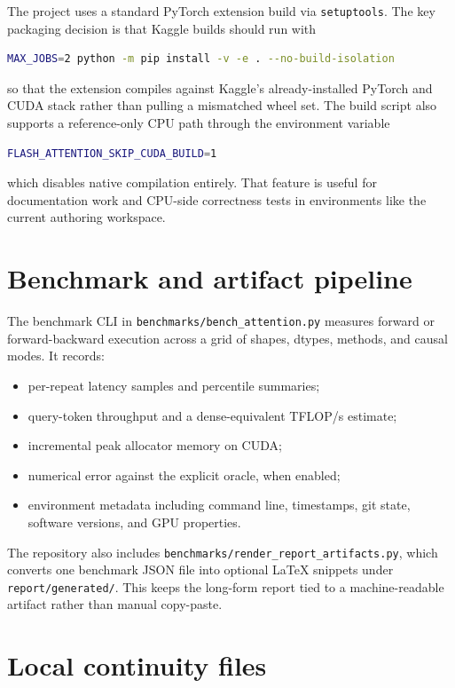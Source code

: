 The project uses a standard PyTorch extension build via \texttt{setuptools}. The key packaging decision is that Kaggle builds should run with
\begin{lstlisting}[language=bash,caption={Kaggle build command.}]
MAX_JOBS=2 python -m pip install -v -e . --no-build-isolation
\end{lstlisting}
so that the extension compiles against Kaggle's already-installed PyTorch and CUDA stack rather than pulling a mismatched wheel set. The build script also supports a reference-only CPU path through the environment variable
\begin{lstlisting}[language=bash]
FLASH_ATTENTION_SKIP_CUDA_BUILD=1
\end{lstlisting}
which disables native compilation entirely. That feature is useful for documentation work and CPU-side correctness tests in environments like the current authoring workspace.

\section{Benchmark and artifact pipeline}

The benchmark CLI in \texttt{benchmarks/bench\_attention.py} measures forward or forward-backward execution across a grid of shapes, dtypes, methods, and causal modes. It records:
\begin{itemize}
  \item per-repeat latency samples and percentile summaries;
  \item query-token throughput and a dense-equivalent TFLOP/s estimate;
  \item incremental peak allocator memory on CUDA;
  \item numerical error against the explicit oracle, when enabled;
  \item environment metadata including command line, timestamps, git state, software versions, and GPU properties.
\end{itemize}

The repository also includes \texttt{benchmarks/render\_report\_artifacts.py}, which converts one benchmark JSON file into optional LaTeX snippets under \texttt{report/generated/}. This keeps the long-form report tied to a machine-readable artifact rather than manual copy-paste.

\section{Local continuity files}

